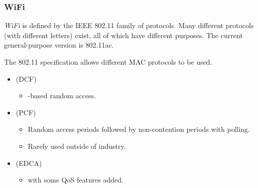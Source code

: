 \subsubsection{WiFi}\label{subsubsec:WiFi}
\begin{definition}[WiFi]\label{def:WiFi}
  \emph{WiFi} is defined by the IEEE 802.11 family of protocols.
  Many different protocols (with different letters) exist, all of which have different purposes.
  The current general-purpose version is 802.11ac.

  The 802.11 specification allows different MAC protocols to be used.
  \begin{itemize}[noitemsep]
  \item {} (DCF)
    \begin{itemize}[noitemsep]
    \item {}-based random access.
    \end{itemize}

  \item {} (PCF)
    \begin{itemize}[noitemsep]
    \item Random access periods followed by non-contention periods with polling.
    \item Rarely used outside of industry.
    \end{itemize}

  \item {} (EDCA)
    \begin{itemize}[noitemsep]
    \item {} with some QoS features added.
    \end{itemize}
  \end{itemize}
\end{definition}

